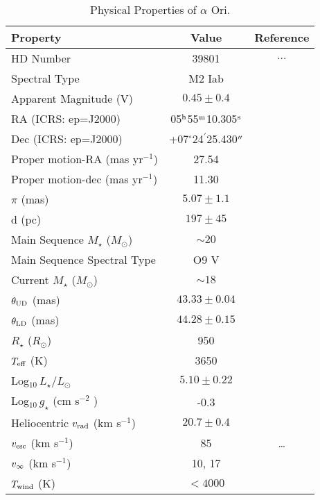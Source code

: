 \begin{table}[!hbt]
\begin{center}
\caption[Physical Properties of $\alpha$ Ori]
{Physical Properties of $\alpha$ Ori.}
\begin{tabular}{lcc}
\hline
\hline
\rule{0pt}{2.5ex}Property & Value & Reference \\
\hline
\rule{0pt}{2.5ex}HD Number & 39801 & $\ldots$\\
Spectral Type & M2 Iab & \cite{perryman_1997} \\ 
Apparent Magnitude (V) & $0.45\pm0.4$ & \cite{perryman_1997}\\
RA (ICRS: ep=J2000)& 05$^{\rm{h}}$55$^{\rm{m}}$10.305$^{\rm{s}}$ & \cite{van_leeuwen_2007}\\
Dec (ICRS: ep=J2000) & +07$^{\circ}$24$^{\prime}$25.430$^{\prime\prime}$& \cite{van_leeuwen_2007}\\
Proper motion-RA (mas yr$^{-1}$)& 27.54 & \cite{van_leeuwen_2007}\\
Proper motion-dec (mas yr$^{-1}$)& 11.30 & \cite{van_leeuwen_2007}\\
$\pi$ (mas)& $5.07\pm1.1$ &\cite{harper_2008}\\
d (pc)& $197\pm45$ & \cite{harper_2008}\\
Main Sequence $M_{\star}$ ($M_{\odot}$) & $\sim 20$ & \cite{meynet_2003}\\
Main Sequence Spectral Type & O9 V & \cite{harper_2008}\\
Current $M_{\star}$ ($M_{\odot}$) & $\sim 18$ & \cite{meynet_2003}\\
$\theta _{\rm{UD}}$ (mas)& $43.33 \pm 0.04$ & \cite{perrin_2004}\\
$\theta _{\rm{LD}}$ (mas)& $44.28 \pm 0.15$ & \cite{haubois_2009}\\
$R_{\star}$ ($R_{\odot}$)& 950 & \cite{harper_2008} \\
$T_{\rm{eff}}$ (K)& 3650 & \cite{levesque_2005}\\
Log$_{10}\,L_{\star}/L_{\odot}$& $5.10\pm0.22$  & \cite{harper_2008}\\
Log$_{10}\,g_{\star}$ (cm s$^{-2}$ )& -0.3 & \cite{meynet_2003} \\
Heliocentric $v_{\rm{rad}}$ (km s$^{-1}$) & $20.7\pm0.4 $& \cite{harper_2008} \\
$v_{\rm{esc}}$ (km s$^{-1}$) & 85 & \dots\\
$v_{\rm{\infty}}$ (km s$^{-1}$)& 10, 17 & \cite{bernat_1979} \\
$T_{\rm{wind}}$ (K)& $< 4000$ & \cite{lim_1998} \\

\end{tabular}
\end{center}
\end{table}
